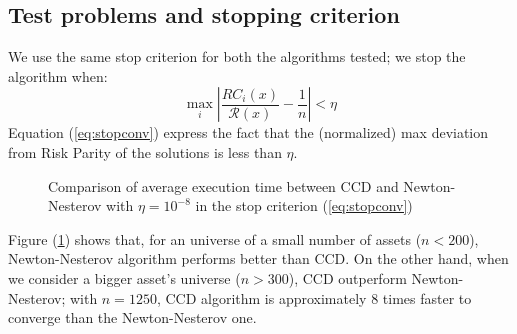 \subsection{Test problems and stopping criterion}
We use the same stop criterion for both the algorithms tested; we stop the algorithm when:
\begin{equation}\label{eq:stopconv}
\max_i \left| \frac{RC_i(x)}{\mathcal{R}(x)} - \frac{1}{n} \right| < \eta
\end{equation}
Equation (\ref{eq:stopconv}) express the fact that the (normalized) max deviation from Risk Parity of the solutions is less than $\eta$.
\begin{figure}
\centering
{}
\caption{Comparison of average execution time between CCD and Newton-Nesterov with $\eta = 10^{-8}$ in the stop criterion (\ref{eq:stopconv})}
\label{fig:convtest}
\end{figure}
Figure (\ref{fig:convtest})  shows that, for an universe of a small number of assets ($n<200$), Newton-Nesterov algorithm performs better than CCD. On the other hand, when we consider a bigger asset's universe ($n>300$), CCD outperform Newton-Nesterov; with $n=1250$, CCD algorithm is approximately 8 times faster to converge than the Newton-Nesterov one.
